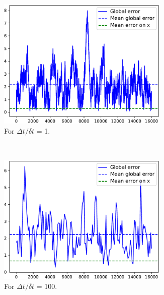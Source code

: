 \documentclass[english, DIV=13]{scrartcl}
\begin{document}
\begin{figure}
    \centering
    \begin{subfigure}{0.49\textwidth}
        \centering
        \includegraphics[width=0.9\textwidth]{figures/error-100-tsdt1}
        \caption{For $\Delta t/\delta t$ = 1.} 
        \label{fig:error-tsdt1}
    \end{subfigure}%
    ~
    \begin{subfigure}{0.49\textwidth}
        \centering
        \includegraphics[width=0.9\textwidth]{figures/error-100-tsdt100}
        \caption{For $\Delta t/\delta t$ = 100.} 
        \label{fig:error-tsdt100}
    \end{subfigure}\\
    \begin{subfigure}{0.49\textwidth}
        \centering

\end{subfigure}
\end{figure}
\end{document}
